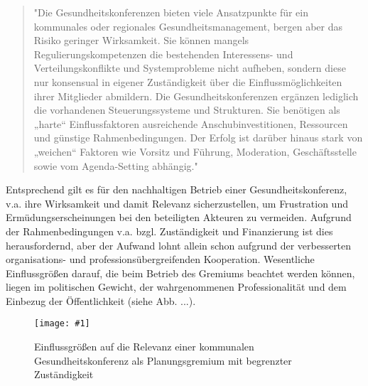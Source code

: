 \documentclass{article}
\newlength{\imgwidth}
\newcommand\scaledgraphics[2]{%
                
\settowidth{\imgwidth}{\texttt{[image: \#1]}}%
                
\setlength{\imgwidth}{\minof{\imgwidth}{#2\textwidth}}%
                
\texttt{[image: \#1]}%
                
}
\begin{document}
\begin{quote}



"Die Gesundheitskonferenzen bieten viele Ansatzpunkte für ein kommunales oder regionales Gesundheitsmanagement, bergen aber das Risiko geringer Wirksamkeit. Sie können mangels Regulierungskompetenzen die bestehenden Interessens- und Verteilungskonflikte und Systemprobleme nicht aufheben, sondern diese nur konsensual in eigener Zuständigkeit über die Einflussmöglichkeiten ihrer Mitglieder abmildern. Die Gesundheitskonferenzen ergänzen lediglich die vorhandenen Steuerungssysteme und Strukturen. Sie benötigen als „harte“ Einflussfaktoren ausreichende Anschubinvestitionen, Ressourcen und günstige Rahmenbedingungen. Der Erfolg ist darüber hinaus stark von „weichen“ Faktoren wie Vorsitz und Führung, Moderation, Geschäftsstelle sowie vom Agenda-Setting abhängig."\autocite{Hollederer2014}


\end{quote}


Entsprechend gilt es für den nachhaltigen Betrieb einer Gesundheitskonferenz, v.a. ihre Wirksamkeit und damit Relevanz sicherzustellen, um Frustration und Ermüdungserscheinungen bei den beteiligten Akteuren zu vermeiden. Aufgrund der Rahmenbedingungen v.a. bzgl. Zuständigkeit und Finanzierung ist dies herausfordernd, aber der Aufwand lohnt allein schon aufgrund der verbesserten organisations- und professionsübergreifenden Kooperation\autocite{Hollederer2016}. Wesentliche Einflussgrößen darauf, die beim Betrieb des Gremiums beachtet werden können, liegen im politischen Gewicht, der wahrgenommenen Professionalität und dem Einbezug der Öffentlichkeit (siehe Abb. ...).

\begin{figure}
\scaledgraphics{ae8130d5-5ce9-46a2-ab35-d904dae29565.png}{1}
\caption*{Einflussgrößen auf die Relevanz einer kommunalen Gesundheitskonferenz als Planungsgremium mit begrenzter Zuständigkeit}\label{F78368531}
\end{figure}
\end{document}

